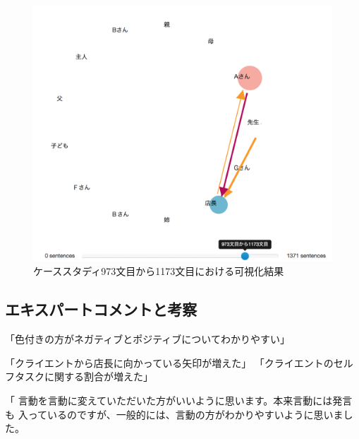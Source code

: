 \documentclass[shuuron]{kuee}
\begin{document}
\begin{figure}
  \begin{center}
    \includegraphics[width=\linewidth]{caseThird.png}
  \end{center}
  \caption{ケーススタディ973文目から1173文目における可視化結果}
  \label{fig:caseThird}
\end{figure}

%

\subsection{エキスパートコメントと考察}

「色付きの方がネガティブとポジティブについてわかりやすい」

「クライエントから店長に向かっている矢印が増えた」
「クライエントのセルフタスクに関する割合が増えた」

「
言動を言動に変えていただいた方がいいように思います。本来言動には発言も
入っているのですが、一般的には、言動の方がわかりやすいように思いました。
\end{document}
